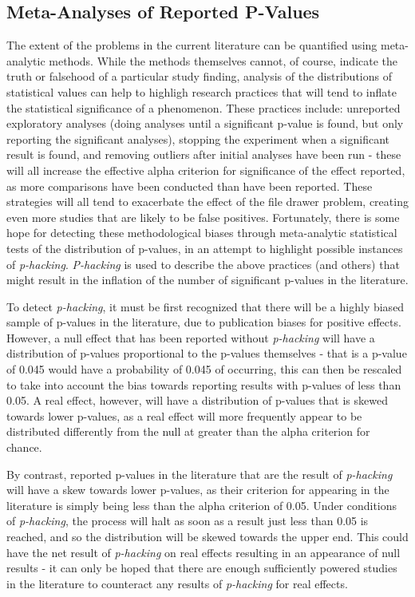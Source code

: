 \documentclass[12pt,a4paper,titlepage]{scrreprt}
\begin{document}
\subsection{Meta-Analyses of Reported P-Values}
The extent of the problems in the current literature can be quantified using meta-analytic methods. While the methods themselves cannot, of course, indicate the truth or falsehood of a particular study finding, analysis of the distributions of statistical values can help to highligh research practices that will tend to inflate the statistical significance of a phenomenon\cite{john_measuring_2012}. These practices include: unreported exploratory analyses (doing analyses until a significant p-value is found, but only reporting the significant analyses), stopping the experiment when a significant result is found, and removing outliers after initial analyses have been run - these will all increase the effective alpha criterion for significance of the effect reported, as more comparisons have been conducted than have been reported. These strategies will all tend to exacerbate the effect of the file drawer problem, creating even more studies that are likely to be false positives\cite{bakker_rules_2012}.
Fortunately, there is some hope for detecting these methodological biases through meta-analytic statistical tests of the distribution of p-values, in an attempt to highlight possible instances of \textit{p-hacking}\cite{simonsohn_p-curve:_2013}. \textit{P-hacking} is used to describe the above practices (and others) that might result in the inflation of the number of significant p-values in the literature.

To detect \textit{p-hacking}, it must be first recognized that there will be a highly biased sample of p-values in the literature, due to publication biases for positive effects. However, a null effect that has been reported without \textit{p-hacking} will have a distribution of p-values proportional to the p-values themselves - that is a p-value of 0.045 would have a probability of 0.045 of occurring, this can then be rescaled to take into account the bias towards reporting results with p-values of less than 0.05. A real effect, however, will have a distribution of p-values that is skewed towards lower p-values, as a real effect will more frequently appear to be distributed differently from the null at greater than the alpha criterion for chance.

By contrast, reported p-values in the literature that are the result of \textit{p-hacking} will have a skew towards lower p-values, as their criterion for appearing in the literature is simply being less than the alpha criterion of 0.05. Under conditions of \textit{p-hacking}, the process will halt as soon as a result just less than 0.05 is reached, and so the distribution will be skewed towards the upper end. This could have the net result of \textit{p-hacking} on real effects resulting in an appearance of null results - it can only be hoped that there are enough sufficiently powered studies in the literature to counteract any results of \textit{p-hacking} for real effects.
\end{document}
